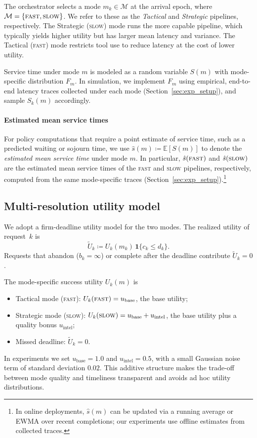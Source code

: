 \documentclass[fleqn,12pt,lineno]{wlpeerj}
\begin{document}
The orchestrator selects a mode $m_k \in \mathcal{M}$ at the arrival epoch, where $\mathcal{M}=\{\textsc{fast},\textsc{slow}\}$. We refer to these as the \emph{Tactical} and \emph{Strategic} pipelines, respectively. The Strategic (\textsc{slow}) mode runs the more capable pipeline, which typically yields higher utility but has larger mean latency and variance. The Tactical (\textsc{fast}) mode restricts tool use to reduce latency at the cost of lower utility.

Service time under mode $m$ is modeled as a random variable $S(m)$ with mode-specific distribution $F_m$. In simulation, we implement $F_m$ using empirical, end-to-end latency traces collected under each mode (Section~\ref{sec:exp_setup}), and sample $S_k(m)$ accordingly.

\paragraph{Estimated mean service times}
For policy computations that require a point estimate of service time, such as a predicted waiting or sojourn time, we use
$\hat{s}(m) \coloneqq \mathbb{E}[S(m)]$ to denote the \emph{estimated mean service time} under mode $m$.
In particular, $\hat{s}(\textsc{fast})$ and $\hat{s}(\textsc{slow})$ are the estimated mean service times of the \textsc{fast} and \textsc{slow} pipelines, respectively, computed from the same mode-specific traces (Section~\ref{sec:exp_setup}).\footnote{In online deployments, $\hat{s}(m)$ can be updated via a running average or EWMA over recent completions; our experiments use offline estimates from collected traces.}

\subsection{Multi-resolution utility model}
\label{sec:utility_model}

We adopt a firm-deadline utility model for the two modes. The realized utility of request~$k$ is
\begin{equation}
\tilde{U}_k \coloneqq U_k(m_k)\,\mathbf{1}\{c_k \le d_k\}.
\label{eq:on_time_utility_model}
\end{equation}
Requests that abandon ($b_k=\infty$) or complete after the deadline contribute $\tilde{U}_k=0$.

The mode-specific success utility $U_k(m)$ is
\begin{itemize}
  \item Tactical mode (\textsc{fast}): $U_k(\textsc{fast}) = u_{\mathrm{base}}$, the base utility;
  \item Strategic mode (\textsc{slow}): $U_k(\textsc{slow}) = u_{\mathrm{base}} + u_{\mathrm{intel}}$, the base utility plus a quality bonus $u_{\mathrm{intel}}$;
  \item Missed deadline: $\tilde{U}_k = 0$.
\end{itemize}
In experiments we set $u_{\mathrm{base}} = 1.0$ and $u_{\mathrm{intel}} = 0.5$, with a small Gaussian noise term of standard deviation $0.02$. This additive structure makes the trade-off between mode quality and timeliness transparent and avoids ad hoc utility distributions.
\end{document}

